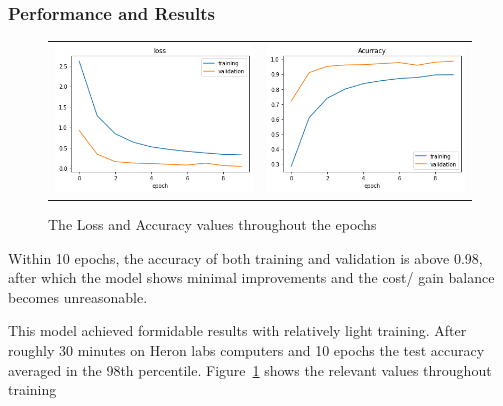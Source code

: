 \documentclass[12pt, landscape]{article}
\begin{document}
\begin{multicols}{3}
\subsubsection{Performance and Results}
\begin{figure}[H]
    \centering
    \begin{tabular}{cc}
    \includegraphics[scale=0.45]{accuracy1.png}&
    \includegraphics[scale=0.45]{accuracy2.png}\\
    \end{tabular}
    \caption{The Loss and Accuracy values throughout the epochs}
    \label{fig:CNNAaccuracy}
\end{figure}
Within 10 epochs, the accuracy of both training and validation is above 0.98,
after which the model shows minimal improvements and the cost/ gain balance
becomes unreasonable.

This model achieved formidable results with relatively light training. After
roughly 30 minutes on Heron labs computers and 10 epochs the test accuracy
averaged in the 98th percentile. Figure~\ref{fig:CNNAaccuracy} shows the
relevant values throughout training


\end{multicols}
\end{document}
